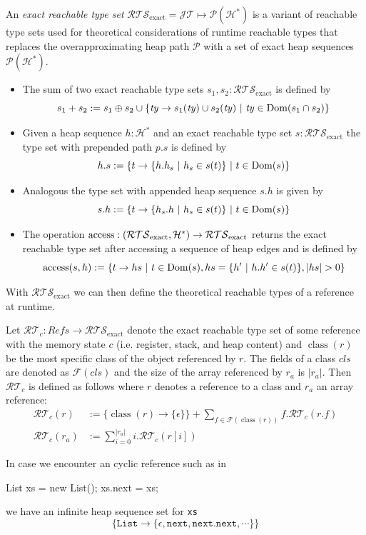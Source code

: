 \begin{definition}
An \emph{exact reachable type set} $\mathcal{RTS}_\text{exact} = \mathcal{JT} \mapsto \mathscr{P}(\mathcal{H}^*)$ is a variant of reachable type sets used for theoretical considerations of runtime reachable types that replaces the overapproximating heap path $\mathcal{P}$ with a set of exact heap sequences $\mathscr{P}(\mathcal{H}^*)$. 
\begin{itemize}
    \item The sum of two exact reachable type sets $s_1, s_2 : \mathcal{RTS}_\text{exact}$ is defined by \[ s_1 + s_2 := s_1 \oplus s_2 \cup \{ \mathit{ty} \to s_1(\mathit{ty}) \cup s_2(\mathit{ty}) \ |\ \mathit{ty} \in \Dom(s_1 \cap s_2) \} \]
    \item Given a heap sequence $h : \mathcal{H}^*$ and an exact reachable type set $s : \mathcal{RTS}_\text{exact}$ the type set with prepended path $p.s$ is defined by \[ h.s :=  \{ t \to \{h.h_s\ |\ h_s \in s(t) \}\ |\ t \in \Dom(s) \} \]
    \item Analogous the type set with appended heap sequence $s.h$ is given by \[ s.h := \{ t \to \{h_s.h\ |\ h_s \in s(t) \}\ |\ t \in \operatorname{Dom}(s) \} \]
    \item The operation $\operatorname{access} : (\mathcal{RTS}_\text{exact}, \mathcal{H}^*) \to \mathcal{RTS}_\text{exact}$ returns the exact reachable type set after accessing a sequence of heap edges and is defined by
    \[ 
    \operatorname{access}(s, h) := \{ t \to hs \ |\ t \in \operatorname{Dom}(s),  hs = \{ h'\ |\ h.h' \in s(t) \}, |hs| > 0 \}
    \]
\end{itemize}
\end{definition}
With $\mathcal{RTS}_\text{exact}$ we can then define the theoretical reachable types of a reference at runtime.
\begin{definition}
\label{def:rrt}
Let $\mathcal{RT}_c : \mathit{Refs} \to \mathcal{RTS}_\text{exact}$ denote the exact reachable type set of some reference with the memory state $c$ (i.e. register, stack, and heap content) and $\operatorname{class}(r)$ be the most specific class of the object referenced by $r$. The fields of a class $\mathit{cls}$ are denoted as $\mathcal{F}(\mathit{cls})$ and the size of the array referenced by $r_a$ is $|r_a|$. Then $\mathcal{RT}_c$ is defined as follows where $r$ denotes a reference to a class and $r_a$ an array reference:
\begin{align*}
    \mathcal{RT}_c(r) &:= \{ \operatorname{class}(r) \to \{ \epsilon \} \} + \sum_{f \in \mathcal{F}(\operatorname{class}(r))} f.\mathcal{RT}_c(r.f) \\
    \mathcal{RT}_c(r_a) &:= \sum_{i=0}^{|r_a|} i.\mathcal{RT}_c(r[i])
\end{align*}
\end{definition}
\begin{remark}
In case we encounter an cyclic reference such as in
\begin{javacode}
List xs = new List();
xs.next = xs;
\end{javacode}
we have an infinite heap sequence set for \texttt{xs}
\[ \{ \mathtt{List} \to \{ \epsilon, \mathtt{next}, \mathtt{next.next}, \cdots\} \} \]
\end{remark}


